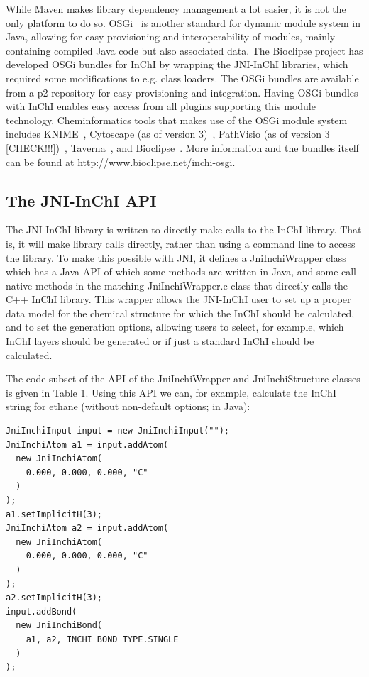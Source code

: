 \documentclass[10pt]{bmc_article}
\newenvironment{bmcformat}{\fussy\setboolean{publ}{true}}{\fussy}
\begin{document}
\begin{bmcformat}
While Maven makes library dependency management a lot easier, it is not the only platform to do so.
OSGi~\cite{osgi} is another standard for dynamic module system in Java, allowing for easy provisioning and interoperability of modules, mainly containing compiled Java code but also associated data. The Bioclipse project has developed OSGi bundles for InChI by wrapping the JNI-InChI libraries, which required some modifications to e.g. class loaders. The OSGi bundles are available from a p2 repository for easy provisioning and integration. Having OSGi bundles with InChI enables easy access from all plugins supporting this module technology. Cheminformatics tools that makes use of the OSGi module system includes KNIME~\cite{Warr:2012kx}, Cytoscape (as of version 3)~\cite{Shannon:2003zr},
PathVisio (as of version 3 [CHECK!!!])~\cite{}, Taverna~\cite{Oinn:2004ys,Truszkowski:2011vn}, and Bioclipse~\cite{Spjuth:2007ve}. 
More information and the bundles itself can be found at \url{http://www.bioclipse.net/inchi-osgi}.

\subsection*{The JNI-InChI API}

The JNI-InChI library is written to directly make calls to the InChI library. That is, it will make library calls
directly, rather than using a command line to access the library. To make this possible with JNI, it defines a
JniInchiWrapper class which has a Java API of which some methods are written in Java, and some call native
methods in the matching JniInchiWrapper.c class that directly calls the C++ InChI library.
This wrapper allows the JNI-InChI user to set up a proper data model for the chemical structure for which the
InChI should be calculated, and to set the generation options, allowing users to select, for example, which
InChI layers should be generated or if just a standard InChI should be calculated.

The code subset of the API of the JniInchiWrapper and JniInchiStructure classes is given in Table 1. Using this
API we can, for example, calculate the InChI string for ethane (without non-default options; in Java):

\begin{verbatim}
JniInchiInput input = new JniInchiInput("");
JniInchiAtom a1 = input.addAtom(
  new JniInchiAtom(
    0.000, 0.000, 0.000, "C"
  )
);
a1.setImplicitH(3);
JniInchiAtom a2 = input.addAtom(
  new JniInchiAtom(
    0.000, 0.000, 0.000, "C"
  )
);
a2.setImplicitH(3);
input.addBond(
  new JniInchiBond(
    a1, a2, INCHI_BOND_TYPE.SINGLE
  )
);
  

\end{verbatim}
\end{bmcformat}
\end{document}
